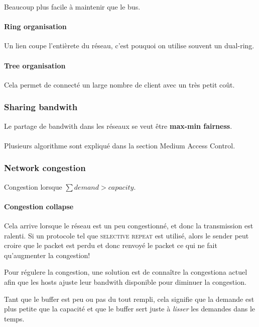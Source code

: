 Beaucoup plus facile à maintenir que le bus.


\paragraph{Ring organisation}
Un lien coupe l'entièrete du réseau, c'est pouquoi on utilise souvent un dual-ring.

\paragraph{Tree organisation}
Cela permet de connecté un large nombre de client avec un très petit coût.


\subsubsection{Sharing bandwith}

Le partage de bandwith dans les réseaux se veut être \textbf{max-min fairness}.

\paragraph{ }Plusieurs algorithme sont expliqué dans la section Medium Access Control.

\subsubsection{Network congestion}

Congestion lorsque $\sum demand > capacity$.

\paragraph{Congestion collapse}
Cela arrive lorsque le réseau est un peu congestionné, et donc la transmission est ralenti.
Si un protocole tel que \textsc{selective repeat} est utilisé, alors le sender peut
croire que le packet est perdu et donc renvoyé le packet ce qui ne fait qu'augmenter
la congestion!


Pour régulere la congestion, une solution est de connaître la congestiona actuel afin que
les hosts ajuste leur bandwith disponible pour diminuer la congestion.

Tant que le buffer est peu ou pas du tout rempli, cela signifie que la demande est plus
petite que la capacité et que le buffer sert juste à \textit{lisser} les demandes dans le temps.


